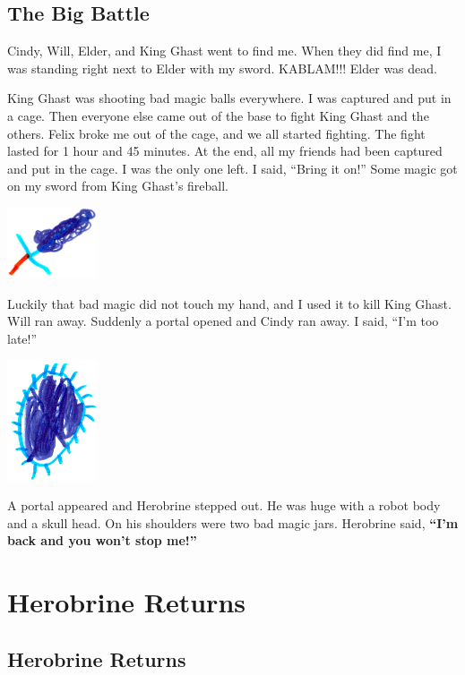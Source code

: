 \documentclass[12pt,twoside]{krantz}
\begin{document}
\hypertarget{the-big-battle}{%
\section{The Big Battle}\label{the-big-battle}}

Cindy, Will, Elder, and King Ghast went to find me. When they did find
me, I was standing right next to Elder with my sword. KABLAM!!! Elder
was dead.

King Ghast was shooting bad magic balls everywhere. I was captured and
put in a cage. Then everyone else came out of the base to fight King
Ghast and the others. Felix broke me out of the cage, and we all started
fighting. The fight lasted for 1 hour and 45 minutes. At the end, all my
friends had been captured and put in the cage. I was the only one left.
I said, ``Bring it on!'' Some magic got on my sword from King Ghast's
fireball.

\includegraphics[width=1.04167in,height=\textheight]{img/king-ghast/13-sword.jpg}

Luckily that bad magic did not touch my hand, and I used it to kill King
Ghast. Will ran away. Suddenly a portal opened and Cindy ran away. I
said, ``I'm too late!''

\includegraphics[width=1.04167in,height=\textheight]{img/king-ghast/14-portal.jpg}

A portal appeared and Herobrine stepped out. He was huge with a robot
body and a skull head. On his shoulders were two bad magic jars.
Herobrine said, \textbf{``I'm back and you won't stop me!''}

\hypertarget{herobrine-returns}{%
\chapter{Herobrine Returns}\label{herobrine-returns}}

\hypertarget{herobrine-returns-1}{%
\section{Herobrine Returns}\label{herobrine-returns-1}}
\end{document}
